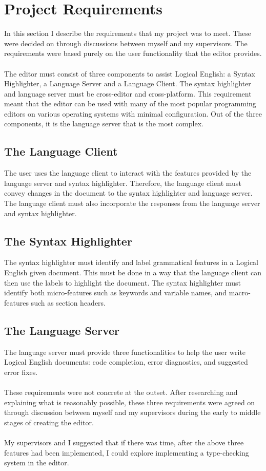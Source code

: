 \documentclass[../main.tex]{subfiles}
\begin{document}
\chapter{Project Requirements}
In this section I describe the requirements that my project was to meet. These were decided on through discussions between myself and my supervisors. The requirements were based purely on the user functionality that the editor provides.
\\
\\
The editor must consist of three components to assist Logical English: a Syntax Highlighter, a Language Server and a Language Client. The syntax highlighter and language server must be cross-editor and cross-platform. This requirement meant that the editor can be used with many of the most popular programming editors on various operating systems with minimal configuration. Out of the three components, it is the language server that is the most complex.

\section{The Language Client}
The user uses the language client to interact with the features provided by the language server and syntax highlighter. Therefore, the language client must convey changes in the document to the syntax highlighter and language server. The language client must also incorporate the responses from the language server and syntax highlighter.

\section{The Syntax Highlighter}
The syntax highlighter must identify and label grammatical features in a Logical English given document. This must be done in a way that the language client can then use the labels to highlight the document. The syntax highlighter must identify both micro-features such as keywords and variable names, and macro-features such as section headers.

\section{The Language Server}
The language server must provide three functionalities to help the user write Logical English documents: code completion, error diagnostics, and suggested error fixes. 
\\ 
\\
These requirements were not concrete at the outset. After researching and explaining what is reasonably possible, these three requirements were agreed on through discussion between myself and my supervisors during the early to middle stages of creating the editor. 
\\
\\
My supervisors and I suggested that if there was time, after the above three features had been implemented, I could explore implementing a type-checking system in the editor.
\end{document}
